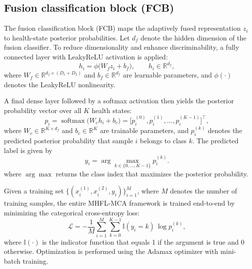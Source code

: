 \documentclass[a4paper]{cas-sc}
\begin{document}
\subsection{Fusion classification block (FCB)}
\label{subsec:fcb}

The fusion classification block (FCB) maps the adaptively fused representation $z_i$ to health-state posterior probabilities.
Let $d_f$ denote the hidden dimension of the fusion classifier.
To reduce dimensionality and enhance discriminability, a fully connected layer with LeakyReLU activation is applied:
\begin{equation}
    h_i = \phi \big( W_f z_i + b_f \big), \qquad
    h_i \in \mathbb{R}^{d_f},
    \label{eq:fcb_dense}
\end{equation}
where $W_f \in \mathbb{R}^{d_f \times (D_1 + D_2)}$ and $b_f \in \mathbb{R}^{d_f}$ are learnable parameters,
and $\phi(\cdot)$ denotes the LeakyReLU nonlinearity.

A final dense layer followed by a softmax activation then yields the posterior probability vector over all $K$ health states:
\begin{equation}
    p_i = \operatorname{softmax}\big( W_c h_i + b_c \big)
    =
    \big[
        p_i^{(0)}, p_i^{(1)}, \dots, p_i^{(K-1)}
    \big]^{\top},
    \label{eq:fcb_softmax}
\end{equation}
where $W_c \in \mathbb{R}^{K \times d_f}$ and $b_c \in \mathbb{R}^{K}$ are trainable parameters, and $p_i^{(k)}$ denotes the predicted posterior probability that sample $i$ belongs to class $k$. The predicted label is given by
\begin{equation}
    \hat{y}_i = \arg\max_{k \in \{0,\dots,K-1\}} p_i^{(k)}.
    \label{eq:fcb_pred_label}
\end{equation}
where $\arg\max$ returns the class index that maximizes the posterior probability.

Given a training set $\{(x_i^{(1)}, x_i^{(2)}, y_i)\}_{i=1}^{M}$, where $M$ denotes the number of training samples, the entire MHFL-MCA framework is trained end-to-end by minimizing the categorical cross-entropy loss:
\begin{equation}
    \mathcal{L}
    =
    -\frac{1}{M}
    \sum_{i=1}^{M}
    \sum_{k=0}^{K-1}
    \mathbb{I}(y_i = k)\,
    \log p_i^{(k)},
    \label{eq:fcb_loss}
\end{equation}
where $\mathbb{I}(\cdot)$ is the indicator function that equals 1 if the argument is true and 0 otherwise. Optimization is performed using the Adamax optimizer with mini-batch training.
\end{document}
